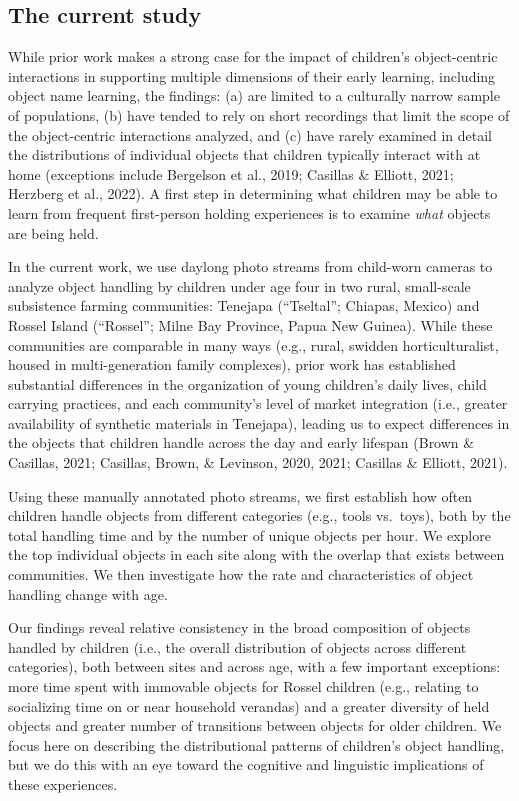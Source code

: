 \documentclass[10pt, letterpaper]{article}
\begin{document}
\hypertarget{the-current-study}{%
\subsection{The current study}\label{the-current-study}}

While prior work makes a strong case for the impact of children's
object-centric interactions in supporting multiple dimensions of their
early learning, including object name learning, the findings: (a) are
limited to a culturally narrow sample of populations, (b) have tended to
rely on short recordings that limit the scope of the object-centric
interactions analyzed, and (c) have rarely examined in detail the
distributions of individual objects that children typically interact
with at home (exceptions include Bergelson et al., 2019; Casillas \&
Elliott, 2021; Herzberg et al., 2022). A first step in determining what
children may be able to learn from frequent first-person holding
experiences is to examine \emph{what} objects are being held.

In the current work, we use daylong photo streams from child-worn
cameras to analyze object handling by children under age four in two
rural, small-scale subsistence farming communities: Tenejapa
(``Tseltal''; Chiapas, Mexico) and Rossel Island (``Rossel''; Milne Bay
Province, Papua New Guinea). While these communities are comparable in
many ways (e.g., rural, swidden horticulturalist, housed in
multi-generation family complexes), prior work has established
substantial differences in the organization of young children's daily
lives, child carrying practices, and each community's level of market
integration (i.e., greater availability of synthetic materials in
Tenejapa), leading us to expect differences in the objects that children
handle across the day and early lifespan (Brown \& Casillas, 2021;
Casillas, Brown, \& Levinson, 2020, 2021; Casillas \& Elliott, 2021).

Using these manually annotated photo streams, we first establish how
often children handle objects from different categories (e.g., tools
vs.~toys), both by the total handling time and by the number of unique
objects per hour. We explore the top individual objects in each site
along with the overlap that exists between communities. We then
investigate how the rate and characteristics of object handling change
with age.

Our findings reveal relative consistency in the broad composition of
objects handled by children (i.e., the overall distribution of objects
across different categories), both between sites and across age, with a
few important exceptions: more time spent with immovable objects for
Rossel children (e.g., relating to socializing time on or near household
verandas) and a greater diversity of held objects and greater number of
transitions between objects for older children. We focus here on
describing the distributional patterns of children's object handling,
but we do this with an eye toward the cognitive and linguistic
implications of these experiences.
\end{document}

